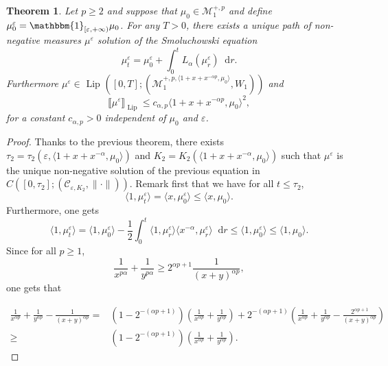 \documentclass[a4paper,11pt, reqno]{amsart}
\newcommand{\cC}{\mathcal{C}}	\newcommand{\CC}{\mathbbm{C}}
\newcommand{\cM}{\mathcal{M}}	\newcommand{\MM}{\mathbbm{M}}
\newcommand{\eps}{\varepsilon}
\newcommand{\dd}{\mathop{}\!\mathrm{d}}
\newcommand{\1}{\mathbbm{1}}
\theoremstyle{plain}
\newtheorem{theorem}{Theorem}[section]
\theoremstyle{definition}
\begin{document}
\begin{theorem}
  Let $p \ge 2$ and suppose that $\mu_0 \in \cM^{+, p}_1$ and
  define $\mu^{\eps}_0 = \mathbbm{1}_{[\eps, + \infty)} \mu_0$.
  For any $T > 0$, there exists a unique path of non-negative measures
  $\mu^{\eps}$ solution of the Smoluchowski equation
  \[ \mu^{\eps}_t = \mu^{\eps}_0 + \int_0^t L_{\alpha}
     (\mu^{\eps}_r) \dd r. \]
  Furthermore $\mu^{\eps} \in  \text{ Lip } ([0, T] ; (\cM^{+, p,
  \langle 1 + x + x^{- \alpha p}, \mu_0 \rangle}_1, W_1))$ and
  \[ \llbracket \mu^{\eps} \rrbracket_{ \text{ Lip } } \le c_{\alpha,
     p} \langle 1 + x + x^{- \alpha p}, \mu_0 \rangle^2, \]
  for a constant $c_{\alpha, p} > 0$ independent of $\mu_0$ and $\eps$.
  
\end{theorem}

\begin{proof}
  Thanks to the previous theorem, there exists $\tau_2 = \tau_2 (\eps,
  \langle 1 + x + x^{- \alpha}, \mu_0 \rangle)$ and $K_2 = K_2 (\langle 1 + x
  + x^{- \alpha}, \mu_0 \rangle)$ such that $\mu^{\eps}$ is the unique
  non-negative solution of the previous equation in $C ([0, \tau_2] ;
  (\cC_{\eps, K_2}, \| \cdot \|))$. Remark first that we have
  for all $t \le \tau_2$,
  \[ \langle 1, \mu^{\eps}_t \rangle = \langle x, \mu^{\eps}_0
     \rangle \le \langle x, \mu_0 \rangle . \]
  Furthermore, one gets
  \begin{equation}
    \langle 1, \mu^{\eps}_t \rangle = \langle 1, \mu^{\eps}_0
    \rangle - \frac{1}{2} \int_0^t \langle 1, \mu^{\eps}_r \rangle
    \langle x^{- \alpha}, \mu^{\eps}_r \rangle \dd r \le
    \langle 1, \mu^{\eps}_0 \rangle \le \langle 1, \mu_0 \rangle
    . \label{eq:invariance-mueps1}
  \end{equation}
  Since for all $p \ge 1$,
  \[ \frac{1}{x^{p \alpha}} + \frac{1}{y^{p \alpha}} \ge 2^{\alpha p +
     1} \frac{1}{(x + y)^{\alpha p}}, \]
  one gets that
  
  \begin{align*}
    \frac{1}{x^{\alpha p}} + \frac{1}{y^{\alpha p}} - \frac{1}{(x + y)^{\alpha
    p}} = & (1 - 2^{- (\alpha p + 1)}) \left( \frac{1}{x^{\alpha p}} +
    \frac{1}{y^{\alpha p}} \right) + 2^{- (\alpha p + 1)} \left(
    \frac{1}{x^{\alpha p}} + \frac{1}{y^{\alpha p}} - \frac{2^{\alpha p +
    1}}{(x + y)^{\alpha p}} \right)\\
    \ge & (1 - 2^{- (\alpha p + 1)}) \left( \frac{1}{x^{\alpha p}} +
    \frac{1}{y^{\alpha p}} \right) .
  \end{align*}
  

\end{proof}
\end{document}
